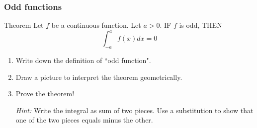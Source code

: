 \documentclass[14pt]{beamer}
\begin{document}
	\begin{frame}[t]
		\fontsize{13}{13}\selectfont
		\frametitle{Odd functions}

		\begin{block}{Theorem}
			Let $f$ be a continuous function. Let $a >0$. IF $f$ is odd, THEN
			\[
				\int_{-a}^{a}f(x) dx = 0
			\]
		\end{block}


		\begin{enumerate}
			\item Write down the definition of ``odd function".

			\item Draw a picture to interpret the theorem geometrically.

			\item Prove the theorem!

				\emph{Hint:} Write the integral as sum of two pieces. Use a substitution
				to show that one of the two pieces equals minus the other.
		\end{enumerate}
	\end{frame}




\end{document}
